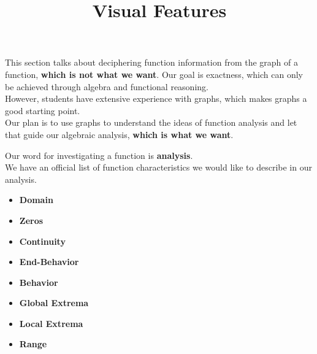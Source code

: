 \documentclass{ximera}
\title{Visual Features}
\begin{document}
\begin{abstract}
\end{abstract}
\maketitle






\begin{warning}


This section talks about deciphering function information from the graph of a function, \textbf{\textcolor{red!80!black}{which is not what we want}}.  Our goal is exactness, which can only be achieved through algebra and functional reasoning.\\

However, students have extensive experience with graphs, which makes graphs a good starting point. \\

Our plan is to use graphs to understand the ideas of function analysis and let that guide our algebraic analysis, \textbf{\textcolor{red!80!black}{which is what we want}}.

\end{warning}





Our word for investigating a function is \textbf{\textcolor{blue!55!black}{analysis}}. \\

We have an official list of function characteristics we would like to describe in our analysis. \\





\begin{itemize}
\item \textbf{\textcolor{red!90!darkgray}{Domain}}
\item \textbf{\textcolor{red!90!darkgray}{Zeros}}
\item \textbf{\textcolor{red!90!darkgray}{Continuity}}
\item \textbf{\textcolor{red!90!darkgray}{End-Behavior}}
\item \textbf{\textcolor{red!90!darkgray}{Behavior}}
\item \textbf{\textcolor{red!90!darkgray}{Global Extrema}}
\item \textbf{\textcolor{red!90!darkgray}{Local Extrema}}
\item \textbf{\textcolor{red!90!darkgray}{Range}}
\end{itemize}
\end{document}
